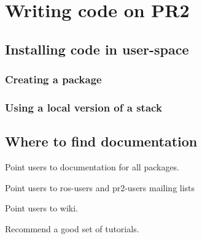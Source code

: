 \chapter{Writing code on PR2}
\section{Installing code in user-space}
\subsection{Creating a package}
\subsection{Using a local version of a stack}
\section{Where to find documentation}
Point users to documentation for all packages.

Point users to ros-users and pr2-users mailing lists

Point users to wiki.

Recommend a good set of tutorials.

